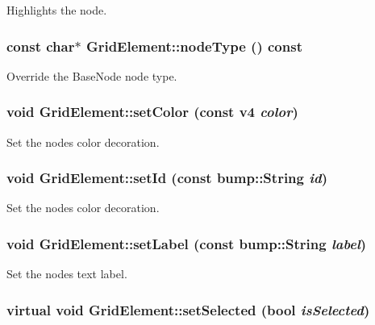 \label{class_grid_element_ab75d977fe8ea590a8fbf89d39beb3adb}
Highlights the node. \hypertarget{class_grid_element_a291030a5523dc79f73da322507f3c9ca}{
\subsubsection[{nodeType}]{\setlength{\rightskip}{0pt plus 5cm}const char$\ast$ GridElement::nodeType () const}}
\label{class_grid_element_a291030a5523dc79f73da322507f3c9ca}
Override the BaseNode node type. \hypertarget{class_grid_element_a3c12632d21165343b41400939d633cb6}{
\subsubsection[{setColor}]{\setlength{\rightskip}{0pt plus 5cm}void GridElement::setColor (const v4 {\em color})}}
\label{class_grid_element_a3c12632d21165343b41400939d633cb6}
Set the nodes color decoration. \hypertarget{class_grid_element_a859628091b3d5076a4442d50f2ab2f10}{
\subsubsection[{setId}]{\setlength{\rightskip}{0pt plus 5cm}void GridElement::setId (const bump::String {\em id})}}
\label{class_grid_element_a859628091b3d5076a4442d50f2ab2f10}
Set the nodes color decoration. \hypertarget{class_grid_element_a0d09f75799f8050ba3bbcee33913898c}{
\subsubsection[{setLabel}]{\setlength{\rightskip}{0pt plus 5cm}void GridElement::setLabel (const bump::String {\em label})}}
\label{class_grid_element_a0d09f75799f8050ba3bbcee33913898c}
Set the nodes text label. \hypertarget{class_grid_element_a31b297b76d790e467e6052a7b12cea7f}{
\subsubsection[{setSelected}]{\setlength{\rightskip}{0pt plus 5cm}virtual void GridElement::setSelected (bool {\em isSelected})}}

